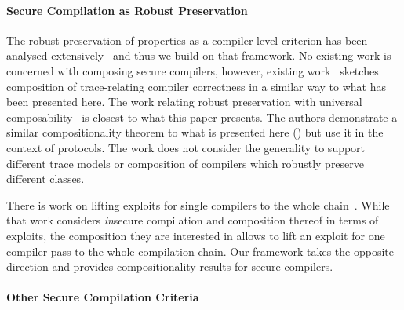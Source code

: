 \documentclass[dvipsnames,conference]{IEEEtran}
\theoremstyle{definition}
\begin{document}
\paragraph*{Secure Compilation as Robust Preservation}\label{subsec:relw:seccomprtp}

The robust preservation of properties as a compiler-level criterion has been analysed extensively~\cite{abate2019jour,patrignani2021rsc,abate2021extacc,patrignani2019survey} and thus we build on that framework.
No existing work is concerned with composing secure compilers, however, existing work~\cite{abate2021extacc} sketches composition of trace-relating compiler correctness in a similar way to what has been presented here.
The work relating robust preservation with universal composability~\cite{patrignani2022universal} is closest to what this paper presents.
The authors demonstrate a similar compositionality theorem to what is presented here () but use it in the context of protocols.
The work does not consider the generality to support different trace models or composition of compilers which robustly preserve different classes.


There is work on lifting exploits for single compilers to the whole chain~\cite{paykin2019weird}.
While that work considers {\em in}secure compilation and composition thereof in terms of exploits, the composition they are interested in allows to lift an exploit for one compiler pass to the whole compilation chain. 
Our framework takes the opposite direction and provides compositionality results for secure compilers.
%
%

\paragraph*{Other Secure Compilation Criteria}\label{subsec:relw:seccompcrit}
\end{document}
